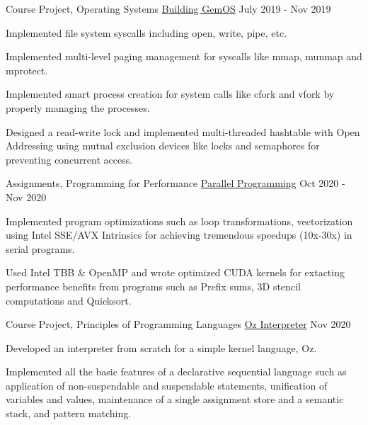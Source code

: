 \begin{cventries}
{\normalsize
  
  \cventry
  {Course Project, Operating Systems}
  {\href{https://github.com/sarthak2007/OperatingSystems_CS330_Assignments}{Building GemOS}}
  {}
  {July 2019 - Nov 2019}
  {
    \begin{cvitems}
      \item Implemented file system syscalls including open, write, pipe, etc.
      \item Implemented multi-level paging management for syscalls like mmap, munmap and mprotect.
      \item Implemented smart process creation for system calls like cfork and vfork by properly managing the processes.
      \item Designed a read-write lock and implemented multi-threaded hashtable with Open Addressing using mutual exclusion
      devices like locks and semaphores for preventing concurrent access.
      \vspace{2mm}
    \end{cvitems}
  }

  \cventry
  {Assignments, Programming for Performance}
  {\href{https://github.com/sarthak2007/Programming-for-performance}{Parallel Programming}}
  {}
  {Oct 2020 - Nov 2020}
  {
    \begin{cvitems}
      \item Implemented program optimizations such as loop transformations, vectorization using Intel SSE/AVX Intrinsics for achieving tremendous speedups (10x-30x) in serial programs.
      \item Used Intel TBB \& OpenMP and wrote optimized CUDA kernels for extacting performance benefits from programs such as Prefix sums, 3D stencil computations and Quicksort.
      \vspace{2mm}
    \end{cvitems}
  }

  \cventry
  {Course Project, Principles of Programming Languages}
  {\href{https://github.com/sarthak2007/Oz_Interpreter}{Oz Interpreter}}
  {}
  {Nov 2020}
  {
    \begin{cvitems}
      \item Developed an interpreter from scratch for a simple kernel language, Oz.
      \item Implemented all the basic features of a declarative sequential language such as application of non-suspendable and suspendable statements, unification of variables and values, maintenance of a single assignment store and a semantic stack, and pattern matching.
      \vspace{2mm}
    \end{cvitems}
  }
  
}
\end{cventries}

